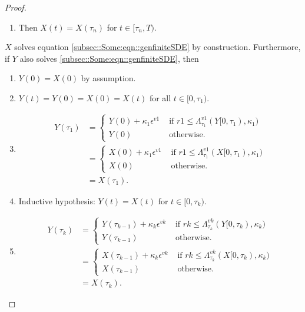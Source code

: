 \documentclass[12pt]{article}
\newcommand{\te}{\text}
\newcommand{\ep}{\epsilon}
\renewcommand{\v}{v}							%
\newcommand{\ev}{\ep}							%
\newcommand{\T}{T}								%
\renewcommand{\t}{t}							%
\newcommand{\X}{X}								%
\newcommand{\vind}[1]{^{#1}}					%
\newcommand{\tp}[1]{(#1)}						%
\newcommand{\tip}[1]{#1}						%
\newcommand{\ts}[1]{_{#1}}						%
\renewcommand{\r}{r}							%
\newcommand{\indx}[1]{_{#1}}					%
\newcommand{\XX}{Y}								%
\newcommand{\rt}{\tau}							%
\renewcommand{\it}{k}							%
\renewcommand{\mark}{\kappa}					%
\newcommand{\ratee}{\Lambda}					%
\begin{document}
\begin{proof}
\begin{enumerate}
\item Then \(\X\tp{\t} = \X\tp{\rt\indx{n}}\) for \(\t\in [\rt\indx{n},\T)\).
\end{enumerate}

\(\X\) solves equation \eqref{subsec::Some:eqn::genfiniteSDE} by construction. Furthermore, if \(\XX\) also solves \eqref{subsec::Some:eqn::genfiniteSDE}, then 

\begin{enumerate}
\item \(\XX\tp{0} = \X\tp{0}\) by assumption.

\item \(\XX\tp{\t} = \XX\tp{0} = \X\tp{0} = \X\tp{\t}\) for all \(\t\in [0,\rt\indx{1})\).

\item 

\begin{align*}
\XX\tp{\rt\indx{1}} &= \begin{cases}
\XX\tp{0} + \mark\indx{1}\ev\vind{\v{1}} &\te{ if } \r{1} \leq \ratee\ts{\rt\indx{1}}\vind{\v{1}}(\XX\tip{[0,\rt\indx{1})},\mark\indx{1})\\
\XX\tp{0} &\te{ otherwise.}
\end{cases}\\
&= \begin{cases}
\X\tp{0} + \mark\indx{1}\ev\vind{\v{1}} &\te{ if } \r{1} \leq \ratee\ts{\rt\indx{1}}\vind{\v{1}}(\X\tip{[0,\rt\indx{1})},\mark\indx{1})\\
\X\tp{0} &\te{ otherwise.}
\end{cases}\\
&= \X\tp{\rt\indx{1}}.
\end{align*}

\item Inductive hypothesis: \(\XX\tp{\t} = \X\tp{\t}\) for \(\t\in [0,\rt\indx{\it})\). 

\item 

\begin{align*}
\XX\tp{\rt\indx{\it}} &= \begin{cases}
\XX\tp{\rt\indx{\it-1}} + \mark\indx{\it}\ev\vind{\v{\it}} &\te{ if } \r{\it} \leq \ratee\ts{\rt\indx{\it}}\vind{\v{\it}}(\XX\tip{[0,\rt\indx{\it})},\mark\indx{\it})\\
\XX\tp{\rt\indx{\it-1}} &\te{ otherwise.}
\end{cases}\\
&= \begin{cases}
\X\tp{\rt\indx{\it-1}} + \mark\indx{\it}\ev\vind{\v{\it}} &\te{ if } \r{\it} \leq \ratee\ts{\rt\indx{\it}}\vind{\v{\it}}(\X\tip{[0,\rt\indx{\it})},\mark\indx{\it})\\
\X\tp{\rt\indx{\it-1}} &\te{ otherwise.}
\end{cases}\\
&= \X\tp{\rt\indx{\it}}.
\end{align*}


\end{enumerate}
\end{proof}
\end{document}
